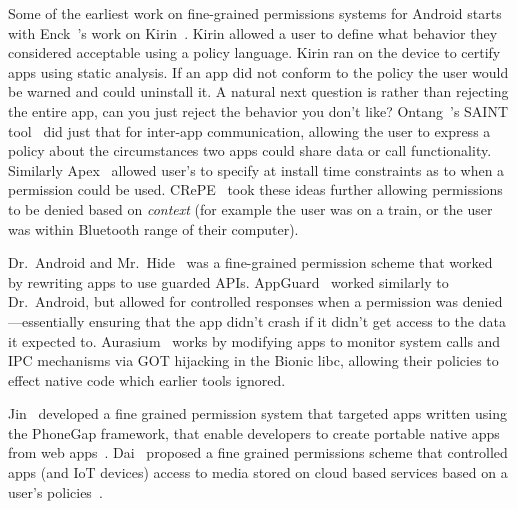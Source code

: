 \documentclass[thesis.tex]{subfiles}
\begin{document}
Some of the earliest work on fine-grained permissions systems for
Android starts with Enck~\etal's work on
Kirin~\cite{enck_lightweight_2009}.  Kirin allowed a user to define
what behavior they considered acceptable using a policy language.
Kirin ran on the device to certify apps using static analysis.  If an
app did not conform to the policy the user would be warned and could
uninstall it.  A natural next question is rather than rejecting the
entire app, can you just reject the behavior you don't like?
Ontang~\etal's SAINT tool~\cite{ongtang_semantically_2012} did just
that for inter-app communication, allowing the user to express a
policy about the circumstances two apps could share data or call
functionality.  Similarly Apex~\cite{nauman_apex:_2010} allowed user's
to specify at install time constraints as to when a permission could
be used.  
CRePE~\cite{conti_crepe:_2010} took
these ideas further allowing permissions to be denied based on
\emph{context} (for example the user was on a train, or the user was
within Bluetooth range of their computer).

Dr{.}~Android and Mr{.}~Hide~\cite{jeon_dr._2012} was a fine-grained permission
scheme that worked by rewriting apps to use guarded APIs.
AppGuard~\cite{backes_appguard_2013} worked similarly to Dr{.}~Android, but
allowed for controlled responses when a permission was denied---essentially
ensuring that the app didn't crash if it didn't get access to the data it
expected to. Aurasium~\cite{xu_aurasium:_2012} works by modifying apps to
monitor system calls and IPC mechanisms via GOT hijacking in the Bionic libc,
allowing their policies to effect native code which earlier tools ignored.

Jin~\etal{} developed a fine grained permission system that targeted apps
written using the PhoneGap framework, that enable developers to create portable
native apps from web apps~\cite{jin_fine-grained_2015}. Dai~\etal{} proposed a
fine grained permissions scheme that controlled apps (and IoT devices) access to
media stored on cloud based services based on a user's
policies~\cite{dai_who_2017}.
\end{document}
